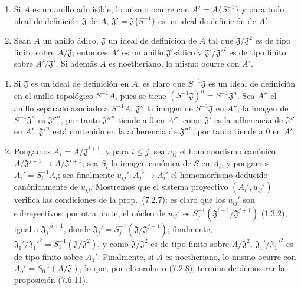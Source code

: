 \begin{proposition}[7.6.11]
\label{0.7.6.11-fr}
\begin{enumerate}
  \item[\rm(i)] Si $A$ es un anillo admisible, lo mismo ocurre con
    $A'=A\{S^{-1}\}$ y para todo ideal de definición $\mathfrak J$ de $A$,
    $\mathfrak J'=\mathfrak J\{S^{-1}\}$ es un ideal de definición de $A'$.
  \item[\rm(ii)] Sean $A$ un anillo ádico, $\mathfrak J$ un ideal de
    definición de $A$ tal que $\mathfrak J/\mathfrak J^2$ es de tipo finito
    sobre $A/\mathfrak J$; entonces $A'$ es un anillo $\mathfrak J'$-ádico y
    $\mathfrak J'/\mathfrak J'^2$ es de tipo finito sobre
    $A'/\mathfrak J'$. Si además $A$ es noetheriano, lo mismo ocurre con
    $A'$.
\end{enumerate}
\end{proposition}

\begin{enumerate}
  \item[\rm(i)] Si $\mathfrak J$ es un ideal de definición en $A$, es
    claro que $S^{-1}\mathfrak J$ es un ideal de definición en el anillo
    topológico $S^{-1}A$, pues se tiene
    $(S^{-1}\mathfrak J)^n=S^{-1}\mathfrak J^n$. Sea $A''$ el anillo separado
    asociado a $S^{-1}A$, $\mathfrak J''$ la imagen de $S^{-1}\mathfrak J$ en
    $A''$; la imagen de $S^{-1}\mathfrak J^n$ es $\mathfrak J''^n$, por tanto
    $\mathfrak J''^n$ tiende a 0 en $A''$; como $\mathfrak J'$ es
    la adherencia de $\mathfrak J''$ en $A'$, $\mathfrak J'^n$ está contenido
    en la adherencia de $\mathfrak J''^n$, por tanto tiende a 0 en $A'$.
  \item[\rm(ii)] Pongamos $A_i=A/\mathfrak J^{i+1}$, y para $i\leq j$, sea
    $u_{ij}$ el homomorfismo canónico
    $A/\mathfrak J^{j+1}\to A/\mathfrak J^{i+1}$; sea $S_i$ la imagen
    canónica de $S$ en $A_i$, y pongamos $A_i'=S_i^{-1}A_i$; sea finalmente
    $u_{ij}':A_j'\to A_i'$ el homomorfismo deducido canónicamente de $u_{ij}$.
    Mostremos que el sistema proyectivo $(A_i',u_{ij}')$ verifica las condiciones
    de la prop.~(7.2.7): es claro que los $u_{ij}'$ son sobreyectivos;
    por otra parte, el núcleo de $u_{ij}'$ es
    $S_j^{-1}(\mathfrak J^{i+1}/\mathfrak J^{j+1})$ (1.3.2), igual a
    $\mathfrak J_j'^{i+1}$, donde
    $\mathfrak J_j'=S_j^{-1}(\mathfrak J/\mathfrak J^{j+1})$; finalmente,
    $\mathfrak J_1'/\mathfrak J_1'^2=S_1^{-1}(\mathfrak J/\mathfrak J^2)$,
    y como $\mathfrak J/\mathfrak J^2$ es de tipo finito sobre
    $A/\mathfrak J^2$, $\mathfrak J_1'/\mathfrak J_1'^2$ es de tipo finito
    sobre $A_1'$. Finalmente, si $A$ es noetheriano, lo mismo ocurre con
    $A_0'=S_0^{-1}(A/\mathfrak J)$, lo que, por el corolario (7.2.8), termina de demostrar la proposición
    (7.6.11).
\end{enumerate}

